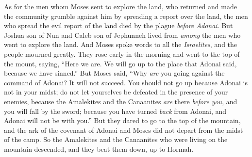 \begin{biblechapter}
\verse As for the men whom Moses sent to explore the land, who returned and made the community grumble against him by spreading a report over the land,
\verse the men who spread the evil report of the land died by the plague \textit{before Adonai}.
\verse But Joshua son of Nun and Caleb son of Jephunneh lived from \textit{among} the men who went to explore the land.
\verse And Moses spoke words to all the \textit{Israelites}, and the people mourned greatly.
\verse They rose early in the morning and went to the top of the mount, saying, “Here we are. We will go up to the place that Adonai said, because we have sinned.”
\verse But Moses said, “Why \textit{are} you going against the command of Adonai? It will not succeed.
\verse You should not go up because Adonai is not in your midst; do not let yourselves be defeated in the presence of your enemies,
\verse because the Amalekites and the Canaanites \textit{are} there \textit{before you}, and you will fall by the sword; because you have turned \textit{back} from Adonai, and Adonai will not be with you.”
\verse But they dared to go to the top of the mountain, and the ark of the covenant of Adonai and Moses did not depart from the midst of the camp.
\verse So the Amalekites and the Canaanites who were living on the mountain descended, and they beat them down, up to Hormah.
\end{biblechapter}

